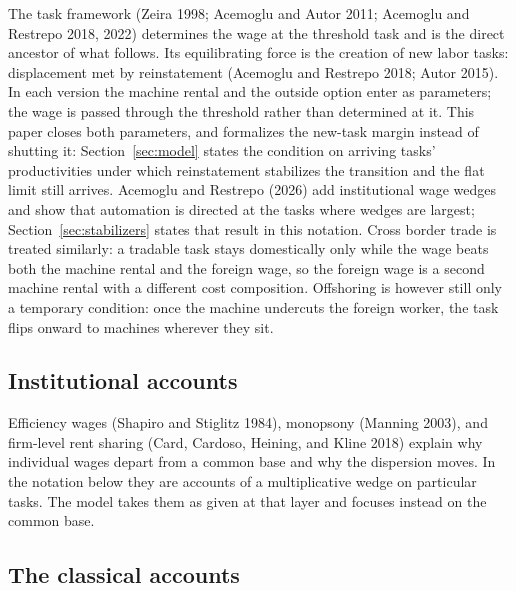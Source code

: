 \documentclass[12pt]{article}
\theoremstyle{plain}
\begin{document}
The task framework (Zeira 1998; Acemoglu and Autor 2011; Acemoglu and Restrepo 2018, 2022) determines the wage at the threshold task and is the direct ancestor of what follows. Its equilibrating force is the creation of new labor tasks: displacement met by reinstatement (Acemoglu and Restrepo 2018; Autor 2015). In each version the machine rental and the outside option enter as parameters; the wage is passed through the threshold rather than determined at it. This paper closes both parameters, and formalizes the new-task margin instead of shutting it: Section~\ref{sec:model} states the condition on arriving tasks' productivities under which reinstatement stabilizes the transition and the flat limit still arrives. Acemoglu and Restrepo (2026) add institutional wage wedges and show that automation is directed at the tasks where wedges are largest; Section~\ref{sec:stabilizers} states that result in this notation. Cross border trade is treated similarly: a tradable task stays domestically only while the wage beats both the machine rental and the foreign wage, so the foreign wage is a second machine rental with a different cost composition. Offshoring is however still only a temporary condition: once the machine undercuts the foreign worker, the task flips onward to machines wherever they sit.

\subsection{Institutional accounts}\label{sec:institutions}

Efficiency wages (Shapiro and Stiglitz 1984), monopsony (Manning 2003), and firm-level rent sharing (Card, Cardoso, Heining, and Kline 2018) explain why individual wages depart from a common base and why the dispersion moves. In the notation below they are accounts of a multiplicative wedge on particular tasks. The model takes them as given at that layer and focuses instead on the common base.

\subsection{The classical accounts}\label{sec:classical}
\end{document}
